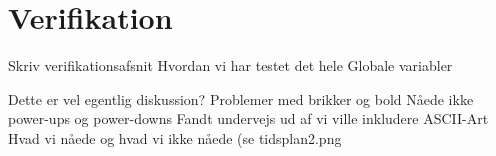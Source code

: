 \chapter{Verifikation}



Skriv verifikationsafsnit
	Hvordan vi har testet det hele
	Globale variabler
	
	
	
	
	
Dette er vel egentlig diskussion?
	Problemer med brikker og bold
	Nåede ikke power-ups og power-downs
	Fandt undervejs ud af vi ville inkludere ASCII-Art
	Hvad vi nåede og hvad vi ikke nåede (se tidsplan2.png
	

